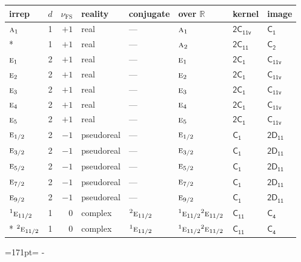 \documentclass[10pt,a4paper]{article}
\makeatletter
\def\grouprule#1#2{\noalign{\marks\LTgroupmarks{\the\belowrulesep}\nobreak\vskip#1%
  \vskip\aboverulesep}\multispan\LT@cols\unskip{\leaders\hrule\@height#2\hfill\kern\z@}\cr
  \noalign{\penalty\LTrulebreak\vskip\belowrulesep\global\@lastruleclass\z@}}
\newcommand{\needspace}[1]{\par\penalty-100\begingroup\dimen0=#1\relax\dimen2=\pagegoal
  \advance\dimen2-\pagetotal\ifdim\dimen0>\dimen2\relax\ifdim\dimen2>0pt\vfil\break\fi\fi
  \endgroup}
\numberwithin{equation}{section}
\newcommand{\grp}[1]{\mathsf{#1}}
\newcommand{\irr}[1]{\text{\normalfont\scshape #1}}
\newcommand{\conjpair}[1]{{}^{#1}}
\newcommand{\detbox}[1]{{\setlength{\fboxsep}{1pt}\fbox{#1}}}
\newcommand{\fsind}{\nu_{\mathrm{FS}}}
\makeatother
\begin{document}
\setlength{\emergencystretch}{2em}\par\setlength{\emergencystretch}{0pt}
{\small\renewcommand{\arraystretch}{1.25}\setlength{\tabcolsep}{4pt}\begin{longtable}{@{}lrrlllll@{}}\toprule
irrep & $d$ & $\fsind$ & reality & conjugate & over $\mathbb{R}$ & kernel & image\\\midrule\endhead
\bottomrule\endfoot\endlastfoot
$\irr{a}_{1}$ & 1 & $+1$ & real & --- & $\irr{a}_{1}$ & \href{2C11v.pdf}{$\grp{2C_{11v}}$} & \href{../../../rotation/data/pdf/C1.pdf}{$\grp{C_{1}}$}\\*
\detbox{$\irr{a}_{2}$} & 1 & $+1$ & real & --- & $\irr{a}_{2}$ & \href{2C11.pdf}{$\grp{2C_{11}}$} & \href{../../../rotation/data/pdf/C2.pdf}{$\grp{C_{2}}$}\\
$\irr{e}_{1}$ & 2 & $+1$ & real & --- & $\irr{e}_{1}$ & \href{2C1.pdf}{$\grp{2C_{1}}$} & \href{../../../rotation/data/pdf/C11v.pdf}{$\grp{C_{11v}}$}\\
$\irr{e}_{2}$ & 2 & $+1$ & real & --- & $\irr{e}_{2}$ & \href{2C1.pdf}{$\grp{2C_{1}}$} & \href{../../../rotation/data/pdf/C11v.pdf}{$\grp{C_{11v}}$}\\
$\irr{e}_{3}$ & 2 & $+1$ & real & --- & $\irr{e}_{3}$ & \href{2C1.pdf}{$\grp{2C_{1}}$} & \href{../../../rotation/data/pdf/C11v.pdf}{$\grp{C_{11v}}$}\\
$\irr{e}_{4}$ & 2 & $+1$ & real & --- & $\irr{e}_{4}$ & \href{2C1.pdf}{$\grp{2C_{1}}$} & \href{../../../rotation/data/pdf/C11v.pdf}{$\grp{C_{11v}}$}\\
$\irr{e}_{5}$ & 2 & $+1$ & real & --- & $\irr{e}_{5}$ & \href{2C1.pdf}{$\grp{2C_{1}}$} & \href{../../../rotation/data/pdf/C11v.pdf}{$\grp{C_{11v}}$}\\
\grouprule{0pt}{\lightrulewidth}
$\irr{e}_{1/2}$ & 2 & $-1$ & pseudoreal & --- & $\irr{e}_{1/2}$ & \href{C1.pdf}{$\grp{C_{1}}$} & \href{2D11.pdf}{$\grp{2D_{11}}$}\\
$\irr{e}_{3/2}$ & 2 & $-1$ & pseudoreal & --- & $\irr{e}_{3/2}$ & \href{C1.pdf}{$\grp{C_{1}}$} & \href{2D11.pdf}{$\grp{2D_{11}}$}\\
$\irr{e}_{5/2}$ & 2 & $-1$ & pseudoreal & --- & $\irr{e}_{5/2}$ & \href{C1.pdf}{$\grp{C_{1}}$} & \href{2D11.pdf}{$\grp{2D_{11}}$}\\
$\irr{e}_{7/2}$ & 2 & $-1$ & pseudoreal & --- & $\irr{e}_{7/2}$ & \href{C1.pdf}{$\grp{C_{1}}$} & \href{2D11.pdf}{$\grp{2D_{11}}$}\\
$\irr{e}_{9/2}$ & 2 & $-1$ & pseudoreal & --- & $\irr{e}_{9/2}$ & \href{C1.pdf}{$\grp{C_{1}}$} & \href{2D11.pdf}{$\grp{2D_{11}}$}\\
$\conjpair{1}\irr{e}_{11/2}$ & 1 & $0$ & complex & $\conjpair{2}\irr{e}_{11/2}$ & $\conjpair{1}\irr{e}_{11/2}\conjpair{2}\irr{e}_{11/2}$ & \href{C11.pdf}{$\grp{C_{11}}$} & \href{../../../rotation/data/pdf/C4.pdf}{$\grp{C_{4}}$}\\*
$\conjpair{2}\irr{e}_{11/2}$ & 1 & $0$ & complex & $\conjpair{1}\irr{e}_{11/2}$ & $\conjpair{1}\irr{e}_{11/2}\conjpair{2}\irr{e}_{11/2}$ & \href{C11.pdf}{$\grp{C_{11}}$} & \href{../../../rotation/data/pdf/C4.pdf}{$\grp{C_{4}}$}\\
\bottomrule\end{longtable}}
\needspace{171pt}
\end{document}
